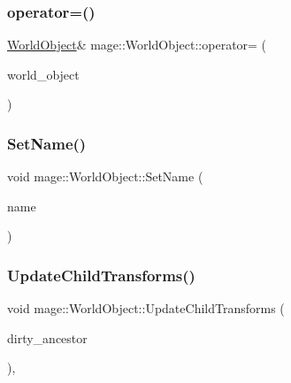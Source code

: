 \hypertarget{classmage_1_1_world_object_a8dbb67991f149a2d4edbcd17ae4ec3ef}{}\label{classmage_1_1_world_object_a8dbb67991f149a2d4edbcd17ae4ec3ef} 
\subsubsection{\texorpdfstring{operator=()}{operator=()}\hspace{0.1cm}{\footnotesize\ttfamily [2/2]}}
{\footnotesize\ttfamily \hyperlink{classmage_1_1_world_object}{World\+Object}\& mage\+::\+World\+Object\+::operator= (\begin{DoxyParamCaption}\item[{\hyperlink{classmage_1_1_world_object}{World\+Object} \&\&}]{world\+\_\+object }\end{DoxyParamCaption})\hspace{0.3cm}{\ttfamily [default]}}

\hypertarget{classmage_1_1_world_object_aee42f65080a69ed5cfc681382328fe31}{}\label{classmage_1_1_world_object_aee42f65080a69ed5cfc681382328fe31} 
\subsubsection{\texorpdfstring{Set\+Name()}{SetName()}}
{\footnotesize\ttfamily void mage\+::\+World\+Object\+::\+Set\+Name (\begin{DoxyParamCaption}\item[{const string \&}]{name }\end{DoxyParamCaption})}

\hypertarget{classmage_1_1_world_object_ab384751f7c14c931e8606f927825b6c8}{}\label{classmage_1_1_world_object_ab384751f7c14c931e8606f927825b6c8} 
\subsubsection{\texorpdfstring{Update\+Child\+Transforms()}{UpdateChildTransforms()}}
{\footnotesize\ttfamily void mage\+::\+World\+Object\+::\+Update\+Child\+Transforms (\begin{DoxyParamCaption}\item[{bool}]{dirty\+\_\+ancestor }\end{DoxyParamCaption})\hspace{0.3cm}{\ttfamily [protected]}, {\ttfamily [virtual]}}



